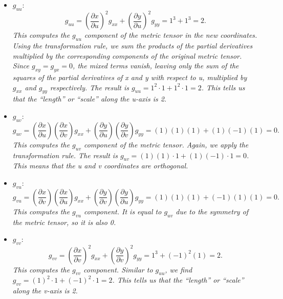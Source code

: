     \begin{itemize}
        \item \(\displaystyle g_{uu}\):
        \[
            g_{uu}
            =
            \left(\frac{\partial x}{\partial u}\right)^2 g_{xx}
            +
            \left(\frac{\partial y}{\partial u}\right)^2 g_{yy}
            =
            1^3 + 1^3
            =
            2.
        \]
        \emph{This computes the \(g_{uu}\) component of the metric tensor in the new coordinates. Using the transformation rule, we sum the products of the partial derivatives multiplied by the corresponding components of the original metric tensor. Since \(g_{xy} = g_{yx} = 0\), the mixed terms vanish, leaving only the sum of the squares of the partial derivatives of x and y with respect to u, multiplied by \(g_{xx}\) and \(g_{yy}\) respectively. The result is \(g_{uu} = 1^2 \cdot 1 + 1^2 \cdot 1 = 2\). This tells us that the “length” or “scale” along the u-axis is 2.}

        \item \(\displaystyle g_{uv}\):
        \[
            g_{uv}
            =
            \left(\frac{\partial x}{\partial u}\right)\left(\frac{\partial x}{\partial v}\right) g_{xx}
            +
            \left(\frac{\partial y}{\partial u}\right)\left(\frac{\partial y}{\partial v}\right) g_{yy}
            =
            (1)(1)(1) + (1)(-1)(1)
            =
            0.
        \]
        \emph{This computes the \(g_{uv}\) component of the metric tensor. Again, we apply the transformation rule. The result is \(g_{uv} = (1)(1) \cdot 1 + (1)(-1) \cdot 1 = 0\). This means that the u and v coordinates are orthogonal.}

        \item \(\displaystyle g_{vu}\):
        \[
            g_{vu}
            =
            \left(\frac{\partial x}{\partial v}\right)\left(\frac{\partial x}{\partial u}\right) g_{xx}
            +
            \left(\frac{\partial y}{\partial v}\right)\left(\frac{\partial y}{\partial u}\right) g_{yy}
            =
            (1)(1)(1) + (-1)(1)(1)
            =
            0.
        \]
        \emph{This computes the \(g_{vu}\) component. It is equal to \(g_{uv}\) due to the symmetry of the metric tensor, so it is also 0.}

        \item \(\displaystyle g_{vv}\):
        \[
            g_{vv}
            =
            \left(\frac{\partial x}{\partial v}\right)^2 g_{xx}
            +
            \left(\frac{\partial y}{\partial v}\right)^2 g_{yy}
            =
            1^3 + (-1)^2 (1)
            =
            2.
        \]
        \emph{This computes the \(g_{vv}\) component. Similar to \(g_{uu}\), we find \(g_{vv} = (1)^2 \cdot 1 + (-1)^2 \cdot 1 = 2\). This tells us that the “length” or “scale” along the v-axis is 2.}
    \end{itemize}

